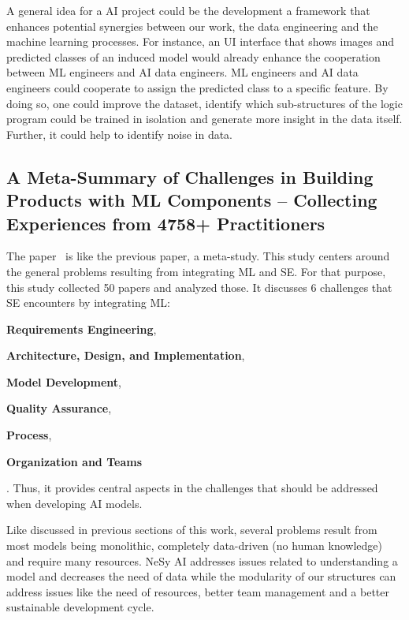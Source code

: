 \documentclass[11pt]{article}
\begin{document}
A general idea for a \ac{AI} project could be the development a framework that enhances potential synergies between our work, the data engineering and the machine learning processes. For instance, an UI interface that shows images and predicted classes of an induced model would already enhance the cooperation between \ac{ML} engineers and \ac{AI} data engineers. \ac{ML} engineers and \ac{AI} data engineers could cooperate to assign the predicted class to a specific feature. By doing so, one could improve the dataset, identify which sub-structures of the logic program could be trained in isolation and generate more insight in the data itself. Further, it could help to identify noise in data.

\newpage

\subsection*{A Meta-Summary of Challenges in Building Products with ML Components – Collecting Experiences from 4758+ Practitioners}

The paper~\cite{naharMetaSummaryChallengesBuilding2023} is like the previous paper, a meta-study. This study centers around the general problems resulting from integrating \ac{ML} and \ac{SE}. For that purpose, this study collected 50 papers and analyzed those. It discusses 6 challenges that \ac{SE} encounters by integrating \ac{ML}:
\begin{inparaenum}
  \item \textbf{Requirements Engineering},
  \item \textbf{Architecture, Design, and Implementation},
  \item \textbf{Model Development},
  \item \textbf{Quality Assurance},
  \item \textbf{Process},
  \item \textbf{Organization and Teams}
\end{inparaenum}.
Thus, it provides central aspects in the challenges that should be addressed when developing \ac{AI} models.

Like discussed in previous sections of this work, several problems result from most models being monolithic, completely data-driven (no human knowledge) and require many resources. \ac{NeSy} AI addresses issues related to understanding a model and decreases the need of data while the modularity of our structures can address issues like the need of resources, better team management and a better sustainable development cycle.
\end{document}
